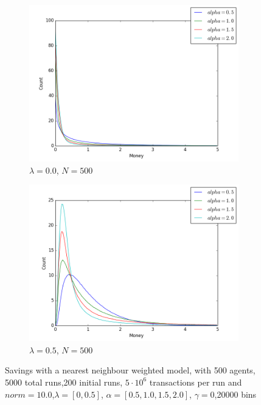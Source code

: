 \documentclass[a4paper,11pt]{article}
\begin{document}
{\begin{figure}[H]
	\centering
	\begin{subfigure}[t]{0.45\textwidth}
		\includegraphics[scale=0.4]{nearestneighbor_lambda=0_0_agens=500}
		\caption{$\lambda = 0.0$, $N=500$}
		\label{fig:0.0_500}
	\end{subfigure}
	\begin{subfigure}[t]{0.45\textwidth}
		\includegraphics[scale=0.4]{nearestneighbor_lambda=0_5_agens=500}
		\caption{$\lambda = 0.5$, $N=500$}
		\label{fig:0.5_500}
	\end{subfigure}
	\caption{Savings with a nearest neighbour weighted  model, with 500 agents, 5000 total runs,200 initial runs,  $5\cdot 10^{6}$ transactions per run and  $norm=10.0$,$\lambda=[0,0.5]$, $\alpha=[0.5,1.0,1.5,2.0]$, $\gamma=0$,20000 bins}
	\label{fig:alpha_n500}
\end{figure}


}
\end{document}
